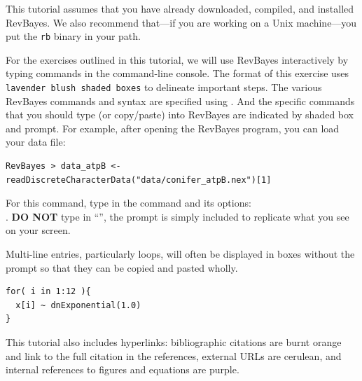This tutorial assumes that you have already downloaded, compiled, and installed RevBayes. 
We also recommend that---if you are working on a Unix machine---you put the {\tt rb} binary in your path.

For the exercises outlined in this tutorial, we will use RevBayes interactively by typing commands in the command-line console.
The format of this exercise uses \colorbox{shadecolor}{\tt lavender blush shaded boxes} to delineate important steps. 
The various RevBayes commands and syntax are specified using . And the specific commands that you should type (or copy/paste) into RevBayes are indicated by shaded box and prompt. For example, after opening the RevBayes program, you can load your data file:

{\tt \begin{snugshade*}
\begin{lstlisting}
RevBayes > data_atpB <- readDiscreteCharacterData("data/conifer_atpB.nex")[1]
\end{lstlisting}
\end{snugshade*}}

For this command, type in the command and its options:\\ . \textbf{DO NOT} type in ``'', the prompt is simply included to replicate what you see on your screen. 

Multi-line entries, particularly loops, will often be displayed in boxes without the  prompt so that they can be copied and pasted wholly. 
{\tt \begin{snugshade*}
\begin{lstlisting}
for( i in 1:12 ){
  x[i] ~ dnExponential(1.0)
}
\end{lstlisting}
\end{snugshade*}}


%


This tutorial also includes hyperlinks: bibliographic citations are {\textcolor{citescol}{burnt orange}} and link to the full citation in the references, external URLs are {\textcolor{urlscol}{cerulean}}, and internal references to figures and equations are {\textcolor{linkscol}{purple}}.

